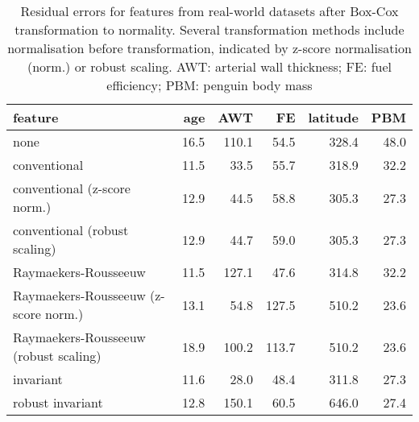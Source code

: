 \documentclass[
  a4paper,
]{article}
\begin{document}
\begin{table}
\begin{center}
\caption{Residual errors for features from real-world datasets after Box-Cox transformation to normality. 
Several transformation methods include normalisation before transformation, indicated by z-score normalisation (norm.) or robust scaling. 
AWT: arterial wall thickness; FE: fuel efficiency; PBM: penguin body mass}
\label{tab:experimental-results-appendix-residuals-bc}
\begin{tabular}{l | r r r r r}

\toprule
feature & age & AWT & FE & latitude & PBM \\

\midrule
none                                  & 16.5 & 110.1 &  54.5 & 328.4 & 48.0 \\
conventional                          & 11.5 &  33.5 &  55.7 & 318.9 & 32.2 \\
conventional (z-score norm.)          & 12.9 &  44.5 &  58.8 & 305.3 & 27.3 \\
conventional (robust scaling)         & 12.9 &  44.7 &  59.0 & 305.3 & 27.3 \\
Raymaekers-Rousseeuw                  & 11.5 & 127.1 &  47.6 & 314.8 & 32.2 \\ 
Raymaekers-Rousseeuw (z-score norm.)  & 13.1 &  54.8 & 127.5 & 510.2 & 23.6 \\
Raymaekers-Rousseeuw (robust scaling) & 18.9 & 100.2 & 113.7 & 510.2 & 23.6 \\
invariant                             & 11.6 &  28.0 &  48.4 & 311.8 & 27.3 \\
robust invariant                      & 12.8 & 150.1 &  60.5 & 646.0 & 27.4 \\

\bottomrule
\end{tabular}
\end{center}
\end{table}
\end{document}

